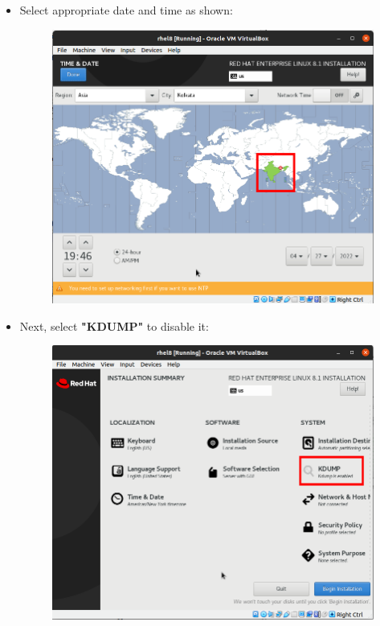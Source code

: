 \begin{flushleft}
\begin{itemize}
	
	
	\item Select appropriate date and time as shown:
	\begin{figure}[h!]
		\centering
		\includegraphics[scale=.3]{content/chapter18/images/server4.png}
	\end{figure}		

	\newpage
	\item Next, select \textbf{"KDUMP"} to disable it:
	\begin{figure}[h!]
		\centering
		\includegraphics[scale=.25]{content/chapter18/images/server5.png}
	\end{figure}			


\end{itemize}
\end{flushleft}
